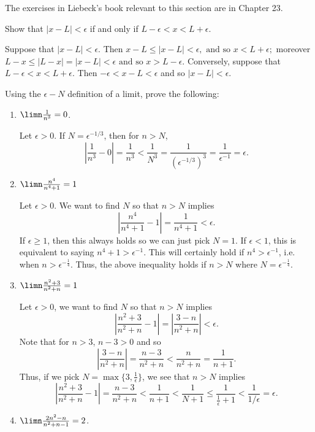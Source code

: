 \documentclass[11pt,dvipsnames]{book}
\numberwithin{figure}{section} %
\numberwithin{table}{section} %
\begin{document}
The exercises in Liebeck's book relevant to this section are in Chapter 23.

\begin{exercise}\label{one}
Show that $|x- L| < \epsilon$ if and only if $L - \epsilon < x < L+ \epsilon$.
\begin{solution}
 Suppose that $|x-L|<\epsilon$. Then $
x-L\leq |x-L|<\epsilon, \mbox{ and so } x < L + \epsilon;
$
moreover
$
L-x \leq |L-x|=|x-L|<\epsilon
\mbox{ and so } x>L-\epsilon.
$
Conversely, suppose that $L-\epsilon<x<L+\epsilon$. Then
$ - \epsilon < x -L < \epsilon$
and so $
|x-L|<\epsilon.$
 \end{solution}
 \end{exercise}

 \begin{exercise}
 Using the $\epsilon-N$ definition of a limit, prove the following:

\begin{enumerate}[label=(\alph*)]
\item $\limn \frac{1}{n^{3}}=0$.
\begin{solution}
Let $\epsilon>0$. If $N=\epsilon^{-1/3}$, then for $n> N$,
\[
\left|\frac{1}{n^3}-0\right|=\frac{1}{n^3}< \frac{1}{N^3}=\frac{1}{ (\epsilon^{-1/3})^3}=\frac{1}{\epsilon^{-1}}=\epsilon.
\]
\end{solution}
\item $\limn \frac{n^{4}}{n^{4}+1}=1$
\begin{solution}
Let $\epsilon>0$. We want to find $N$ so that $n> N$ implies
\[
\left|\frac{n^{4}}{n^{4}+1}-1\right|=\frac{1}{n^4+1}<\epsilon.
\]
If $\epsilon\geq 1$, then this always holds so we can just pick $N=1$. If $\epsilon<1$, this is equivalent to saying $n^4+1>\epsilon^{-1}$. This will certainly hold if $n^4>\epsilon^{-1}$, i.e. when $n>\epsilon^{-\frac{1}{4}}$. Thus, the above inequality holds if $n>N$ where $N=\epsilon^{-\frac{1}{4}}$.
\end{solution}
\item $\limn \frac{n^{2}+3}{n^{2}+n}=1$
\begin{solution}
Let $\epsilon>0$, we want to find $N$ so that $n> N$ implies
\[
\left|\frac{n^{2}+3}{n^{2}+n}-1\right|=\left|\frac{3-n}{n^2+n}\right|<\epsilon.
\]
Note that for $n> 3$, $n-3> 0$ and so
\[
\left|\frac{3-n}{n^2+n}\right|=\frac{n-3}{n^2+n}<\frac{n}{n^2+n}=\frac{1}{n+1}.
\]
Thus, if we pick $N=\max\{3,\frac{1}{\epsilon}\}$, we see that $n> N$ implies
\[
\left|\frac{n^{2}+3}{n^{2}+n}-1\right|=\frac{n-3}{n^2+n}<\frac{1}{n+1}< \frac{1}{N+1}\leq \frac{1}{\frac{1}{\epsilon}+1}<\frac{1}{1/\epsilon}=\epsilon.
\]
\end{solution}
\item $\limn \frac{2n^{2}-n}{n^{2}+n-1}=2$.


\end{enumerate}
\end{exercise}
\end{document}
